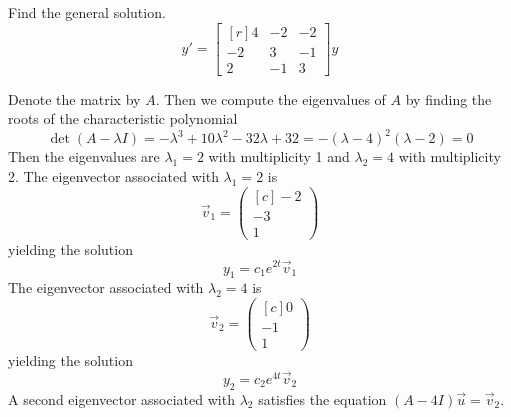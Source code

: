\documentclass[11pt, titlepage]{article}
\begin{document}
  \pagebreak

  \begin{problem}[Trench 10.5.11]
    Find the general solution.
    \begin{equation*}
      y' =
      \begin{bmatrix*}[r]
        4 & -2 & -2 \\
        -2 & 3 & -1 \\
        2 & -1 & 3
      \end{bmatrix*} y
    \end{equation*}
  \end{problem}

  \begin{solution}
    Denote the matrix by \(A\). Then we compute the eigenvalues of \(A\) by finding the roots of the characteristic polynomial
    \begin{equation*}
      \det(A - \lambda I) = -\lambda^{3} + 10 \lambda^{2} - 32 \lambda + 32
      = -(\lambda - 4)^{2} (\lambda - 2) = 0
    \end{equation*}
    Then the eigenvalues are \(\lambda_{1} = 2\) with multiplicity 1 and \(\lambda_{2} = 4\) with multiplicity 2.
    The eigenvector associated with \(\lambda_{1} = 2\) is
    \begin{equation*}
      \vec{v}_{1} =
      \begin{pmatrix*}[c]
        -2 \\
        -3 \\
        1
      \end{pmatrix*}
    \end{equation*}
    yielding the solution
    \begin{equation*}
      y_{1} = c_{1} e^{2t} \vec{v}_{1}
    \end{equation*}
    The eigenvector associated with \(\lambda_{2} = 4\) is
    \begin{equation*}
      \vec{v}_{2} =
      \begin{pmatrix*}[c]
        0 \\
        -1 \\
        1
      \end{pmatrix*}
    \end{equation*}
    yielding the solution
    \begin{equation*}
      y_{2} = c_{2} e^{4t} \vec{v}_{2}
    \end{equation*}
    A second eigenvector associated with \(\lambda_{2}\) satisfies the equation \((A - 4I) \vec{u} = \vec{v}_{2}\).

\end{solution}
\end{document}
